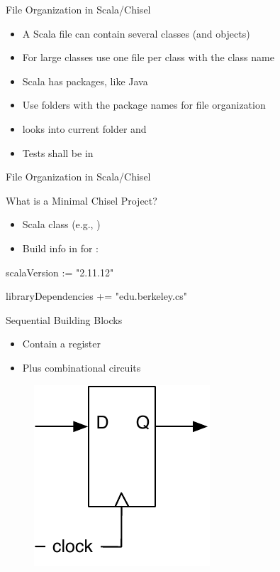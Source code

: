 \begin{frame}[fragile]{File Organization in Scala/Chisel}
\begin{itemize}
\item A Scala file can contain several classes (and objects)
\item For large classes use one file per class with the class name
\item Scala has packages, like Java
\item Use folders with the package names for file organization
\item {} looks into current folder and 
\item Tests shall be in 
\end{itemize}
\end{frame}

\begin{frame}[fragile]{File Organization in Scala/Chisel}
\end{frame}

\begin{frame}[fragile]{What is a Minimal Chisel Project?}
\begin{itemize}
\item Scala class (e.g., )
\item Build info in  for :
\end{itemize}
\begin{chisel}
scalaVersion := "2.11.12"

libraryDependencies += "edu.berkeley.cs" %
\end{chisel}
\end{frame}



\begin{frame}[fragile]{Sequential Building Blocks}
\begin{itemize}
\item Contain a register
\item Plus combinational circuits
\end{itemize}
\begin{figure}
  \includegraphics[scale=\scale]{../figures/register}
\end{figure}
\end{frame}

